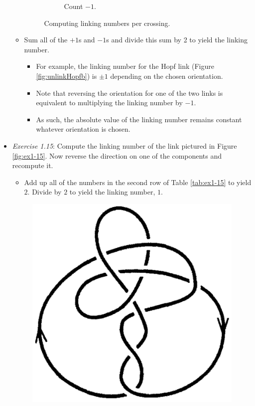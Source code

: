 \documentclass[titlepage]{article}
\numberwithin{figure}{section}
\numberwithin{table}{section}
\numberwithin{equation}{section}
\begin{document}
\begin{itemize}
\begin{itemize}
\begin{figure}[h!]
\begin{subfigure}[b]{0.2\linewidth}
                \centering
                \caption{Count $-1$.}
                \label{fig:linkingnumberb}
            \end{subfigure}
            \caption{Computing linking numbers per crossing.}
            \label{fig:linkingnumber}
        \end{figure}
        \item Sum all of the $+1$s and $-1$s and divide this sum by 2 to yield the linking number.
        \begin{itemize}
            \item For example, the linking number for the Hopf link (Figure \ref{fig:unlinkHopfb}) is $\pm 1$ depending on the chosen orientation.
            \item Note that reversing the orientation for one of the two links is equivalent to multiplying the linking number by $-1$.
            \item As such, the absolute value of the linking number remains constant whatever orientation is chosen.
        \end{itemize}
    \end{itemize}
    \item \emph{Exercise 1.15}: Compute the linking number of the link pictured in Figure \ref{fig:ex1-15}. Now reverse the direction on one of the components and recompute it.
    \begin{itemize}
        \item Add up all of the numbers in the second row of Table \ref{tab:ex1-15} to yield $2$. Divide by $2$ to yield the linking number, $1$.
    \end{itemize}
    \begin{figure}[h!]
        \centering
        \includegraphics[width=0.2\linewidth]{Blender/ex1-15.png}

\end{figure}
\end{itemize}
\end{document}
